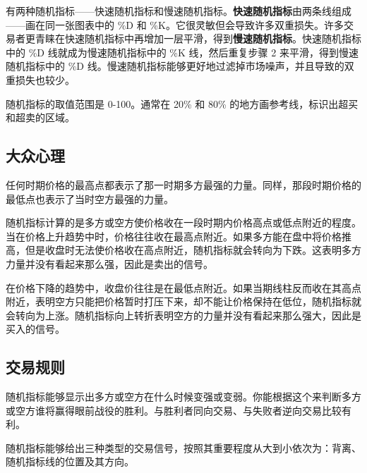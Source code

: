 有两种随机指标——快速随机指标和慢速随机指标。\textbf{快速随机指标}由两条线组成——画在同一张图表中的 \%D 和 \%K。它很灵敏但会导致许多双重损失。许多交易者更青睐在快速随机指标中再增加一层平滑，得到\textbf{慢速随机指标}。快速随机指标中的 \%D 线就成为慢速随机指标中的 \%K 线，然后重复步骤 2 来平滑，得到慢速随机指标中的 \%D 线。慢速随机指标能够更好地过滤掉市场噪声，并且导致的双重损失也较少。


随机指标的取值范围是 0-100。通常在 20\% 和 80\% 的地方画参考线，标识出超买和超卖的区域。
\subsection*{大众心理}
任何时期价格的最高点都表示了那一时期多方最强的力量。同样，那段时期价格的最低点也表示了当时空方最强的力量。

随机指标计算的是多方或空方使价格收在一段时期内价格高点或低点附近的程度。当在价格上升趋势中时，价格往往收在最高点附近。如果多方能在盘中将价格推高，但是收盘时无法使价格收在高点附近，随机指标就会转向为下跌。这表明多方力量并没有看起来那么强，因此是卖出的信号。

在价格下降的趋势中，收盘价往往是在最低点附近。如果当期线柱反而收在其高点附近，表明空方只能把价格暂时打压下来，却不能让价格保持在低位，随机指标就会转向为上涨。随机指标向上转折表明空方的力量并没有看起来那么强大，因此是买入的信号。
\subsection*{交易规则}
随机指标能够显示出多方或空方在什么时候变强或变弱。你能根据这个来判断多方或空方谁将赢得眼前战役的胜利。与胜利者同向交易、与失败者逆向交易比较有利。

随机指标能够给出三种类型的交易信号，按照其重要程度从大到小依次为：背离、随机指标线的位置及其方向。
